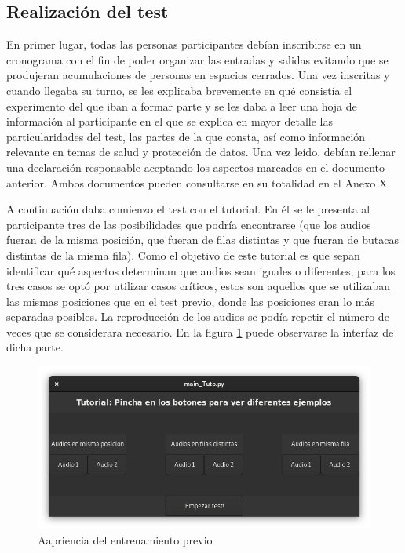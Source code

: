 \documentclass[11pt,a4paper,twoside]{book}
\begin{document}
            \subsection*{Realización del test}
                En primer lugar, todas las personas participantes debían inscribirse en un cronograma con el fin de poder organizar las entradas y salidas evitando que se produjeran acumulaciones de personas en espacios cerrados. Una vez inscritas y cuando llegaba su turno, se les explicaba brevemente en qué consistía el experimento del que iban a formar parte y se les daba a leer una hoja de información al participante en el que se explica en mayor detalle las particularidades del test, las partes de la que consta, así como información relevante en temas de salud y protección de datos. Una vez leído, debían rellenar una declaración responsable aceptando los aspectos marcados en el documento anterior. Ambos documentos pueden consultarse en su totalidad en el Anexo X.
                
                A continuación daba comienzo el test con el tutorial. En él se le presenta al participante tres de las posibilidades que podría encontrarse (que los audios fueran de la misma posición, que fueran de filas distintas y que fueran de butacas distintas de la misma fila). Como el objetivo de este tutorial es que sepan identificar qué aspectos determinan que audios sean iguales o diferentes, para los tres casos se optó por utilizar casos críticos, estos son aquellos que se utilizaban las mismas posiciones que en el test previo, donde las posiciones eran lo más separadas posibles. La reproducción de los audios se podía repetir el número de veces que se considerara necesario. En la figura \ref{fig:interfazTutorial} puede observarse la interfaz de dicha parte.
                
                \begin{figure}
                    \includegraphics[scale=0.6]{../imagenes/interfaz_tutorial.png}
			        \centering
			        \caption{Aapriencia del entrenamiento previo}
			        \label{fig:interfazTutorial}
                \end{figure}
                
\end{document}

